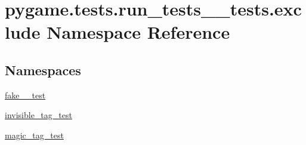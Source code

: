 \hypertarget{namespacepygame_1_1tests_1_1run__tests____tests_1_1exclude}{}\section{pygame.\+tests.\+run\+\_\+tests\+\_\+\+\_\+tests.\+exclude Namespace Reference}
\label{namespacepygame_1_1tests_1_1run__tests____tests_1_1exclude}
\subsection*{Namespaces}
\begin{DoxyCompactItemize}
\item 
 \hyperlink{namespacepygame_1_1tests_1_1run__tests____tests_1_1exclude_1_1fake__2__test}{fake\+\_\+\_\+test}
\item 
 \hyperlink{namespacepygame_1_1tests_1_1run__tests____tests_1_1exclude_1_1invisible__tag__test}{invisible\+\_\+tag\+\_\+test}
\item 
 \hyperlink{namespacepygame_1_1tests_1_1run__tests____tests_1_1exclude_1_1magic__tag__test}{magic\+\_\+tag\+\_\+test}
\end{DoxyCompactItemize}
